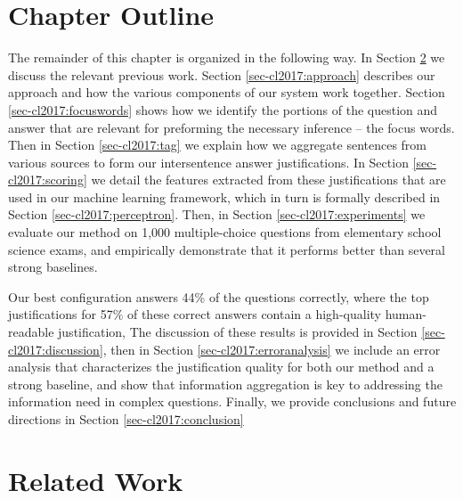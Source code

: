 \section{Chapter Outline}

The remainder of this chapter is organized in the following way.  In Section \ref{sec-cl2017:relatedwork} we discuss the relevant previous work.  Section \ref{sec-cl2017:approach} describes our approach and how the various components of our system work together.  Section \ref{sec-cl2017:focuswords} shows how we identify the portions of the question and answer that are relevant for preforming the necessary inference -- the focus words.  Then in Section \ref{sec-cl2017:tag} we explain how we aggregate sentences from various sources to form our intersentence answer justifications.  In Section \ref{sec-cl2017:scoring} we detail the features extracted from these justifications that are used in our machine learning framework, which in turn is formally described in Section \ref{sec-cl2017:perceptron}.  
Then, in Section \ref{sec-cl2017:experiments} we evaluate our method on 1,000 multiple-choice questions from elementary school science exams, and empirically demonstrate that it performs better than several strong baselines.%

Our best configuration answers 44\% of the questions correctly, where the top justifications for 57\% of these correct answers contain a high-quality human-readable justification,   
The discussion of these results is provided in Section \ref{sec-cl2017:discussion}, then in Section \ref{sec-cl2017:erroranalysis}
we include an error analysis that characterizes the justification quality for both our method and a strong baseline, and show that information aggregation is key to addressing the information need in complex questions.  Finally, we provide conclusions and future directions in Section \ref{sec-cl2017:conclusion}


\section{Related Work}
\label{sec-cl2017:relatedwork}

